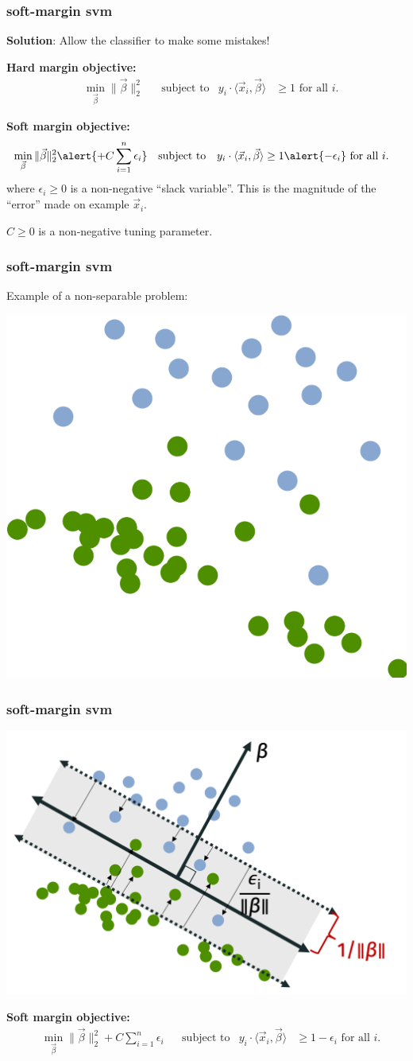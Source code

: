 \documentclass[handout,compress]{beamer}
\begin{document}
\begin{frame}
	\frametitle{soft-margin svm}
	\textbf{Solution}: Allow the classifier to make some mistakes! 
	
	\textbf{Hard margin objective:}
	\begin{align*}
	&\min_{\vec{\beta}} \|\vec{\beta}\|_2^2 & &\text{subject to}  & y_i\cdot\langle \vec{x}_i, \vec{\beta}\rangle &\geq 1 \text{ for all } i.
	\end{align*}
	
	\textbf{Soft margin objective:}
	\begin{align*}
	&\min_{\vec{\beta}} \|\vec{\beta}\|_2^2 \alert{+ C\sum_{i=1}^n\epsilon_i} & &\text{subject to}  & y_i\cdot\langle \vec{x}_i, \vec{\beta}\rangle &\geq 1 \alert{- \epsilon_i} \text{ for all } i.
	\end{align*}
	where $\epsilon_i \geq 0$ is a non-negative ``slack variable''. This is the magnitude of the ``error'' made on example $\vec{x}_i$. 
	
	$C \geq 0$ is a non-negative tuning parameter.
\end{frame}

\begin{frame}
	\frametitle{soft-margin svm}
	Example of a non-separable problem:
	\begin{center}
		\includegraphics[width =.35\textwidth]{nonsep_example.png}
	\end{center}
\end{frame}

\begin{frame}
	\frametitle{soft-margin svm}
	\begin{center}
		\includegraphics[width =.6\textwidth]{soft_margin.png}
	\end{center}
	\textbf{Soft margin objective:}
\begin{align*}
&\min_{\vec{\beta}} \|\vec{\beta}\|_2^2 + C\sum_{i=1}^n\epsilon_i & &\text{subject to}  & y_i\cdot\langle \vec{x}_i, \vec{\beta}\rangle &\geq 1 - \epsilon_i \text{ for all } i.
\end{align*}
\end{frame}
\end{document}
